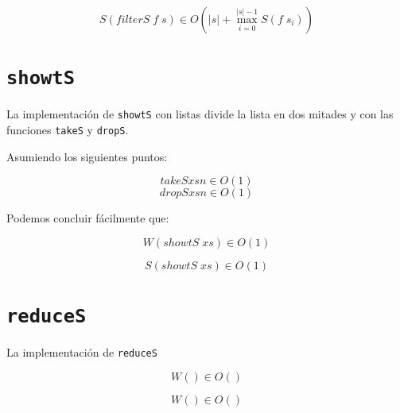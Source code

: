 \documentclass[a4paper,10pt]{article}
\begin{document}
\begin{equation*}
    S \left( filterS\; f \; s \right) \in
    O \left( \vert s \vert + \max_{i=0}^{\vert s \vert -1} S \left( f \; s_i \right) \right)
\end{equation*}



\section*{\texttt{showtS}}

    La implementación de \texttt{showtS} con listas divide la lista en dos mitades
y con las funciones \texttt{takeS} y \texttt{dropS}.

    Asumiendo los siguientes puntos:

\begin{equation*}
    takeS xs n \in O \left( 1 \right)
\end{equation*}
\begin{equation*}
    dropS xs n \in O \left( 1 \right)
\end{equation*}
    
    Podemos concluir fácilmente que:

\begin{equation*}
    W \left( showtS\; xs \right) \in O \left( 1 \right)
\end{equation*}

\begin{equation*}
    S \left( showtS\; xs \right) \in O \left( 1 \right)
\end{equation*}

    

\section*{\texttt{reduceS}}

    La implementación de \texttt{reduceS} 

\begin{equation*}
    W \left( \right) \in
    O \left( \right)
\end{equation*}

\begin{equation*}
    W \left( \right) \in
    O \left( \right)
\end{equation*}
\end{document}
